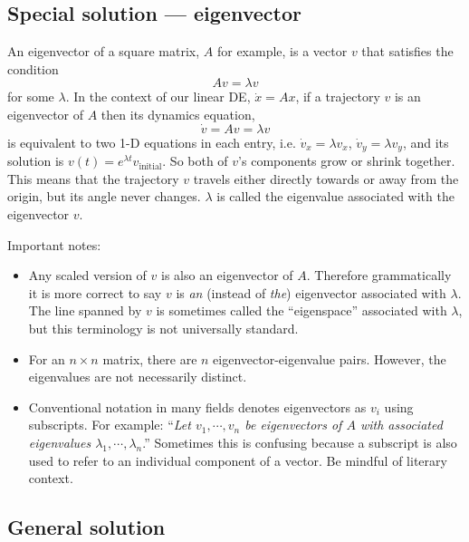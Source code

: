 \documentclass[11pt, oneside]{article}   	%
\begin{document}
\subsection*{Special solution --- eigenvector}

An eigenvector of a square matrix, $A$ for example, is a vector $v$ that satisfies the condition
\begin{equation}
  Av = \lambda v
\end{equation}
for some $\lambda$.
In the context of our linear DE, $\dot{x} = Ax$, if a trajectory $v$ is an eigenvector of $A$ then its dynamics equation,
\begin{equation}
  \dot{v} = Av = \lambda v
\end{equation}
is equivalent to two 1-D equations in each entry, i.e. $\dot{v}_x = \lambda v_x$, $\dot{v}_y = \lambda v_y$,
and its solution is $v(t) = e^{\lambda t}v_{\mathrm{initial}}$.
So both of $v$'s components grow or shrink together.
This means that the trajectory $v$ travels either directly towards or away from the origin, but its angle never changes.
$\lambda$ is called the eigenvalue associated with the eigenvector $v$.

Important notes:
\begin{itemize}
\item Any scaled version of $v$ is also an eigenvector of $A$.
Therefore grammatically it is more correct to say $v$ is \textit{an} (instead of \textit{the}) eigenvector associated with $\lambda$.
The line spanned by $v$ is sometimes called the ``eigenspace'' associated with $\lambda$, but this terminology is not universally standard.
\item For an $n\times n$ matrix, there are $n$ eigenvector-eigenvalue pairs. However, the eigenvalues are not necessarily distinct.
\item Conventional notation in many fields denotes eigenvectors as $v_i$ using subscripts.
For example: ``\textit{Let $ v_1,\cdots,v_n $ be eigenvectors of $A$ with associated eigenvalues $ \lambda_1,\cdots,\lambda_n $}.''
Sometimes this is confusing because a subscript is also used to refer to an individual component of a vector.
Be mindful of literary context.
\end{itemize}

\subsection*{General solution}
\end{document}
